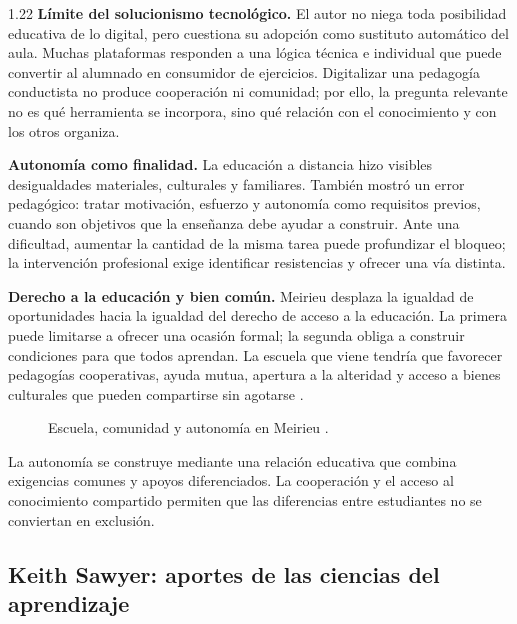 \documentclass[spanish,letterpaper,oneside]{article}
\begin{document}
\begin{reportelecturabox}[title={Reporte de lectura 1: Philippe Meirieu}]
\begin{spacing}{1.22}
\medskip\noindent\textbf{Límite del solucionismo tecnológico.}\enspace
El autor no niega toda posibilidad educativa de lo digital, pero cuestiona su adopción como sustituto automático del aula. Muchas plataformas responden a una lógica técnica e individual que puede convertir al alumnado en consumidor de ejercicios. Digitalizar una pedagogía conductista no produce cooperación ni comunidad; por ello, la pregunta relevante no es qué herramienta se incorpora, sino qué relación con el conocimiento y con los otros organiza.

\medskip\noindent\textbf{Autonomía como finalidad.}\enspace
La educación a distancia hizo visibles desigualdades materiales, culturales y familiares. También mostró un error pedagógico: tratar motivación, esfuerzo y autonomía como requisitos previos, cuando son objetivos que la enseñanza debe ayudar a construir. Ante una dificultad, aumentar la cantidad de la misma tarea puede profundizar el bloqueo; la intervención profesional exige identificar resistencias y ofrecer una vía distinta.

\medskip\noindent\textbf{Derecho a la educación y bien común.}\enspace
Meirieu desplaza la igualdad de oportunidades hacia la igualdad del derecho de acceso a la educación. La primera puede limitarse a ofrecer una ocasión formal; la segunda obliga a construir condiciones para que todos aprendan. La escuela que viene tendría que favorecer pedagogías cooperativas, ayuda mutua, apertura a la alteridad y acceso a bienes culturales que pueden compartirse sin agotarse \citep{meirieu2020escuela}.
\end{spacing}
\end{reportelecturabox}

\begin{figure}[H]
\centering
\resizebox{\linewidth}{!}{\MapaMeirieu}
\caption{Escuela, comunidad y autonomía en Meirieu \citep{meirieu2020escuela}.}
\label{fig:mapa-meirieu}
\end{figure}
La autonomía se construye mediante una relación educativa que combina exigencias comunes y apoyos diferenciados. La cooperación y el acceso al conocimiento compartido permiten que las diferencias entre estudiantes no se conviertan en exclusión.

\subsection{Keith Sawyer: aportes de las ciencias del aprendizaje}
\end{document}
